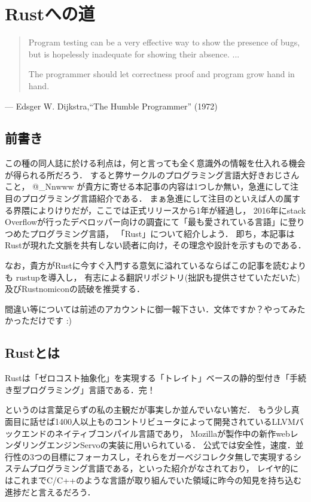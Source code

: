 \chapter{Rustへの道}
\begin{quotation}
  Program testing can be a very effective way to show the presence of bugs, \\
  but is hopelessly inadequate for showing their absence. ...

  The programmer should let correctness proof and program grow hand in hand.
\end{quotation}
\begin{flushright}
  --- Edsger W. Dijkstra,``The Humble Programmer'' (1972)
\end{flushright}

\section{前書き}
この種の同人誌に於ける利点は，何と言っても全く意識外の情報を仕入れる機会が得られる所だろう．
すると弊サークルのプログラミング言語大好きおじさんこと， @\_Nnwww が貴方に寄せる本記事の内容は1つしか無い，急進にして注目のプログラミング言語紹介である．
まぁ急進にして注目のといえば人の属する界隈によりけりだが，ここでは正式リリースから1年が経過し，
2016年にstack Overflowが行ったデベロッパー向けの調査にて「最も愛されている言語」に登りつめたプログラミング言語\cite{most_loved}，
「Rust」について紹介しよう．
即ち，本記事はRustが現れた文脈を共有しない読者に向け，その理念や設計を示すものである．

なお，貴方がRustに今すぐ入門する意気に溢れているならばこの記事を読むよりも
rustup\cite{rustup}を導入し，
有志による翻訳リポジトリ\cite{rustdoc_ja}(拙訳も提供させていただいた)及びRustnomicon\cite{nomicon}の読破を推奨する．

間違い等については前述のアカウントに御一報下さい．文体ですか？やってみたかっただけです :)

\section{Rustとは}
Rustは「ゼロコスト抽象化」を実現する「トレイト」ベースの静的型付き「手続き型プログラミング」言語である．完！

というのは言葉足らずの私の主観だが事実しか並んでいない筈だ．
もう少し真面目に話せば1400人以上ものコントリビュータによって開発されているLLVMバックエンドのネイティブコンパイル言語であり，
Mozillaが製作中の新作webレンダリングエンジンServoの実装に用いられている．
公式では安全性，速度．並行性の3つの目標にフォーカスし，それらをガーベジコレクタ無しで実現するシステムプログラミング言語である，といった紹介がなされており，
レイヤ的にはこれまでC/C++のような言語が取り組んでいた領域に昨今の知見を持ち込む進捗だと言えるだろう．

